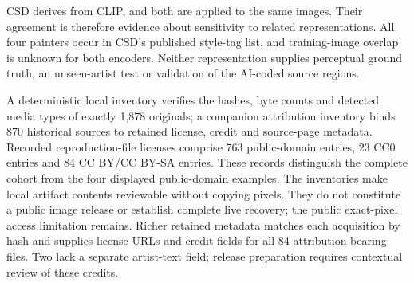 CSD derives from CLIP, and both are applied to the same images. Their agreement
is therefore evidence about sensitivity to related representations. All four
painters occur in CSD's published style-tag list, and training-image overlap is
unknown for both encoders. Neither representation supplies perceptual ground truth,
an unseen-artist test or validation of the AI-coded source regions.

A deterministic local inventory verifies the hashes, byte counts and detected
media types of exactly 1,878 originals; a companion attribution inventory binds
870 historical sources to retained license, credit and source-page metadata.
Recorded reproduction-file licenses comprise 763 public-domain entries, 23 CC0
entries and 84 CC BY/CC BY-SA entries. These records distinguish the complete
cohort from the four displayed public-domain examples. The inventories make local
artifact contents reviewable without copying pixels. They do not constitute a
public image release or establish complete live recovery; the public exact-pixel
access limitation remains.
Richer retained metadata matches each acquisition by hash and supplies license
URLs and credit fields for all 84 attribution-bearing files. Two lack a separate
artist-text field; release preparation requires contextual review of these credits.
